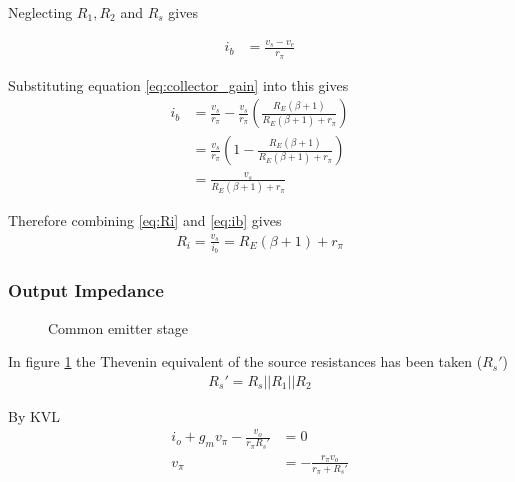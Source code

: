 \documentclass[a4paper,11pt]{article}
\begin{document}
Neglecting $R_1, R_2$ and $R_s$ gives

\begin{align*}
i_b &= \frac{v_s-v_e}{r_\pi} 
\end{align*}

Substituting equation \ref{eq:collector_gain} into this gives
\begin{align}
i_b &= \frac{v_s}{r_\pi} - \frac{v_s}{r_\pi} (\frac{R_E (\beta + 1)}{R_E (\beta + 1) + r_\pi}) \nonumber \\
&= \frac{v_s}{r_\pi} (1- \frac{R_E (\beta + 1)}{R_E (\beta + 1) + r_\pi}) \nonumber \\
&= \frac{v_s}{R_E (\beta + 1) + r_\pi} \label{eq:ib}
\end{align}

Therefore combining \ref{eq:Ri} and \ref{eq:ib} gives 
\begin{align}
R_i = \frac{v_s}{i_b} = R_E (\beta + 1) + r_\pi \label{eq:collector_input_imp}
\end{align}

\subsubsection{Output Impedance}
\begin{figure}[H]
	\centering
	\caption{Common emitter stage}
	\label{fig:o_imp_collector}
	\hfill
\end{figure}

In figure \ref{fig:o_imp_collector} the Thevenin equivalent of the source resistances has been taken ($R_s'$)
\begin{align*}
R_s' = R_s || R_1 || R_2
\end{align*}

By KVL 
\begin{align}
i_o + g_m v_\pi - \frac{v_o}{r_\pi R_s'} &= 0 \label{eq:KVL}\\
v_\pi &= - \frac{r_\pi v_o}{r_\pi + R_s'} \label{eq:vpi}
\end{align}
\end{document}
